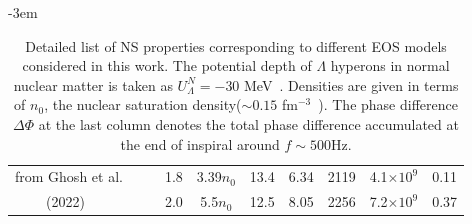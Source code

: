\documentclass[%
 reprint,
 amsmath,amssymb,
 aps,
]{revtex4-2}
\begin{document}
\begin{table}
\begin{adjustwidth}{-3em}{}
\begin{center}
\begin{tabular}{|c|c|c|c|c|c|c|c|c|c|}
    from Ghosh et al.& & & 1.8 & 3.39$n_0$ & 13.4 & 6.34 & 2119 & 4.1$\times 10^9$ & 0.11 \\
    (2022)~\cite{Ghosh_2022}& & & 2.0 & 5.5$n_0$ & 12.5 & 8.05 & 2256 & 7.2$\times 10^9$ & 0.37 \\
    \hline
    \end{tabular} 
\end{center}
\end{adjustwidth}
    \caption{Detailed list of NS properties corresponding to different EOS models considered in this work. The potential depth of $\Lambda$ hyperons in normal nuclear matter is taken as $U_{\Lambda}^N = -30 $ MeV~\cite{Weissenborn_2012}. Densities are given in terms of $n_0$, the nuclear saturation density($\sim 0.15 $ fm$^{-3}$~\cite{Oertel2017}). The phase difference $\Delta\Phi$ at the last column denotes the total phase difference accumulated at the end of inspiral around $f \sim 500$Hz.}
    \label{tab:table1}
\end{table}
\end{document}
